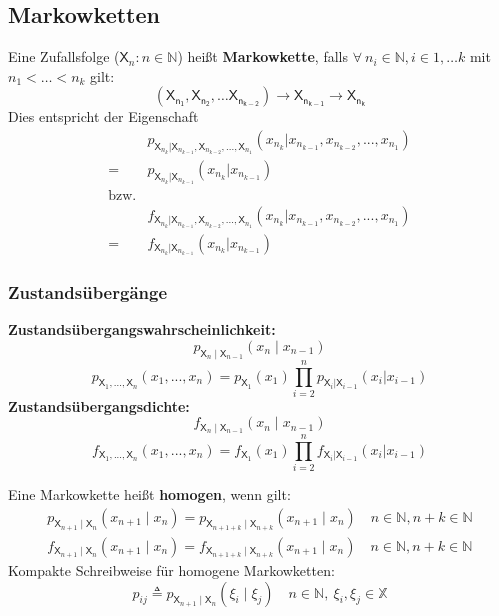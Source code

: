 \documentclass[a4paper,twocolumn,10pt]{article}
\begin{document}
\subsection{Markowketten}
Eine Zufallsfolge ($\mathsf{X}_{n}: n \in \mathbb{N}$) heißt \textbf{Markowkette}, falls $\forall \ n_{i} \in \mathbb{N}, i \in {1, \dots k}$ mit $n_{1} < \dots < n_{k}$ gilt:
\[ \mathsf{(X_{n_{1}},X_{n_{2}}, \dots X_{n_{k-2}}) \rightarrow X_{n_{k-1}} \rightarrow X_{n_{k}}}\]
Dies entspricht der Eigenschaft
\begin{equation*}
\begin{split}
&p_{\mathsf{X}_{n_k}|\mathsf{X}_{n_{k-1}},\mathsf{X}_{n_{k-2}},...,\mathsf{X}_{n_1}}(x_{n_k}|x_{n_{k-1}},x_{n_{k-2}},...,x_{n_1})\\
=&p_{\mathsf{X}_{n_k}|\mathsf{X}_{n_{k-1}}}(x_{n_k}|x_{n_{k-1}})\\
\text{bzw.}\\
&f_{\mathsf{X}_{n_k}|\mathsf{X}_{n_{k-1}},\mathsf{X}_{n_{k-2}},...,\mathsf{X}_{n_1}}(x_{n_k}|x_{n_{k-1}},x_{n_{k-2}},...,x_{n_1})\\
=&f_{\mathsf{X}_{n_k}|\mathsf{X}_{n_{k-1}}}(x_{n_k}|x_{n_{k-1}})
\end{split}
\end{equation*}

\subsubsection{Zustandsübergänge}
\textbf{Zustandsübergangswahrscheinlichkeit:} 
\[ p_{\mathsf{X}_{n} \mid \mathsf{X}_{n-1}}(x_{n} \mid x_{n-1})\]
\[p_{\mathsf{X}_1,...,\mathsf{X}_n}(x_1,...,x_n)=p_{\mathsf{X}_1}(x_1)\prod\limits_{i=2}^{n}p_{\mathsf{X}_i|\mathsf{X}_{i-1}}(x_i|x_{i-1})\]
\textbf{Zustandsübergangsdichte:}
\[ f_{\mathsf{X}_{n} \mid \mathsf{X}_{n-1}}(x_{n} \mid x_{n-1})\]
\[f_{\mathsf{X}_1,...,\mathsf{X}_n}(x_1,...,x_n)=f_{\mathsf{X}_1}(x_1)\prod\limits_{i=2}^{n}f_{\mathsf{X}_i|\mathsf{X}_{i-1}}(x_i|x_{i-1})\]

Eine Markowkette heißt \textbf{homogen}, wenn gilt:
\begin{align} p_{\mathsf{X}_{n+1} \mid \mathsf{X}_{n}} (x_{n+1} \mid x_{n}) = p_{\mathsf{X}_{n+1+k} \mid \mathsf{X}_{n+k}} (x_{n+1} \mid x_{n}) \quad n \in \mathbb{N}, n + k \in \mathbb{N} \nonumber \\
f_{\mathsf{X}_{n+1} \mid \mathsf{X}_{n}} (x_{n+1} \mid x_{n}) = f_{\mathsf{X}_{n+1+k} \mid \mathsf{X}_{n+k}} (x_{n+1} \mid x_{n}) \quad n \in \mathbb{N}, n + k \in \mathbb{N} \nonumber 
\end{align}
Kompakte Schreibweise für homogene Markowketten:
\[ p_{ij} \triangleq p_{\mathsf{X}_{n+1} \mid \mathsf{X}_{n}} (\xi_{i} \mid \xi_{j}) \quad n \in \mathbb{N}, \ \xi_{i}, \xi_{j} \in \mathbb{X}\] 
\end{document}
